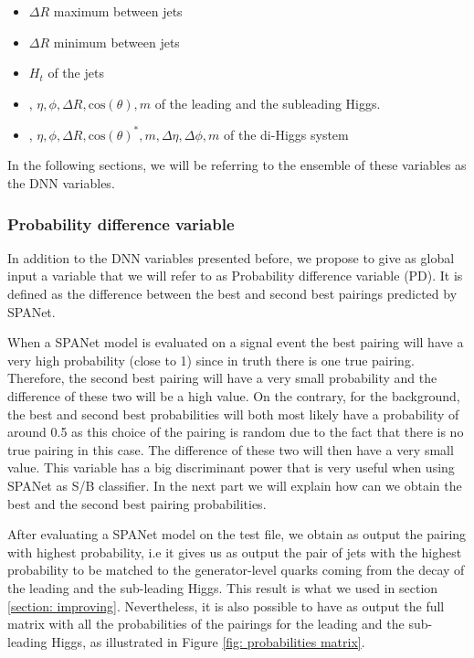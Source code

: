 \begin{itemize}
    \item $\Delta R$ maximum between jets
    \item $\Delta R$ minimum between jets
    \item $H_t$ of the jets
    \item \pt, $\eta, \phi, \Delta R, \text{cos}(\theta), m$ of the leading and the subleading Higgs.
    \item \pt, $\eta, \phi, \Delta R, \text{cos}(\theta)^*, m, \Delta\eta, \Delta \phi, m$ of the di-Higgs system
\end{itemize}

\noindent In the following sections, we will be referring to the ensemble of these variables as the {DNN variables}.


\subsubsection{Probability difference variable}

In addition to the DNN variables presented before, we propose to give as global input a variable that we will refer to as {Probability difference variable} (PD). It is defined as the difference between the best and second best pairings predicted by SPANet.

When a SPANet model is evaluated on a signal event the best pairing will have a very high probability (close to 1) since in truth there is one true pairing. Therefore, the second best pairing will have a very small probability and the difference of these two will be a high value. On the contrary, for the background, the best and second best probabilities will both most likely have a probability of around 0.5 as this choice of the pairing is random due to the fact that there is no true pairing in this case. The difference of these two will then have a very small value. This variable has a big discriminant power that is very useful when using SPANet as S/B classifier. In the next part we will explain how can we obtain the best and the second best pairing probabilities.


After evaluating a SPANet model on the test file, we obtain as output the pairing with highest probability, i.e it gives us as output the pair of jets with the highest probability to be matched to the generator-level quarks coming from the decay of the leading and the sub-leading Higgs. This result is what we used in section \ref{section: improving}. Nevertheless, it is also possible to have as output the full matrix with all the probabilities of the pairings for the leading and the sub-leading Higgs, as illustrated in Figure \ref{fig: probabilities matrix}.


